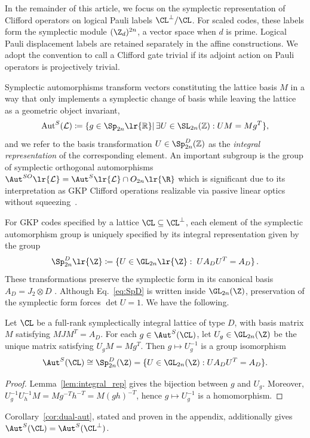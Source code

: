 \documentclass[a4paper, aps, pra, 11pt, onecolumn, tightenlines, superscriptaddress]{revtex4-2}
\begin{document}
In the remainder of this article, we focus on the symplectic representation of Clifford operators on logical Pauli labels $\CL^{\perp}/\CL$. For scaled codes, these labels form the symplectic module $(\Z_d)^{2n}$, a vector space when $d$ is prime. Logical Pauli displacement labels are retained separately in the affine constructions. We adopt the convention to call a Clifford gate trivial if its adjoint action on Pauli operators is projectively trivial.

Symplectic automorphisms transform vectors constituting the lattice basis $M$ in a way that only implements a symplectic change of basis while leaving the lattice as a geometric object invariant, 
\begin{equation}
\label{eq:AutS}
    \text{Aut}^{S}(\mathcal{L}) \coloneqq \{ g \in \Sp_{2n}\lr{\mathbb{R}} |\,  \exists U \in \SL_{2n}( \mathbb{Z}):  UM  = M g^{T}\},
\end{equation}
and we refer to the basis transformation $U\in \Sp^D_{2n}( \mathbb{Z})$ as the \textit{integral representation} of the corresponding element.
An important subgroup is the group of symplectic orthogonal automorphisms $\Aut^{SO}\lr{\mathcal{L}}=\Aut^{S}\lr{\mathcal{L}}\cap O_{2n}\lr{\R}$ which is significant due to its interpretation as GKP Clifford operations realizable via passive linear optics without squeezing~\cite{Weedbrook_2012}.

For GKP codes specified by a lattice $\CL \subseteq\CL^{\perp}$, each element of the symplectic automorphism group is uniquely specified by its integral representation given by the group
\begin{equation}
\label{eq:SpD}
    \Sp_{2n}^D\lr{\Z} \coloneqq \{U\in \GL_{2n}\lr{\Z}:\; UA_DU^T=A_D\}\,.
\end{equation}
These transformations preserve the symplectic form in its canonical basis $A_D=J_2\otimes D$ \cite{Birkenhake_2004}. 
Although Eq.~\eqref{eq:SpD} is written inside $\GL_{2n}(\Z)$, preservation of the symplectic form forces $\det U=1$.
We have the following.
\begin{lem}\label{prop:cliff}
Let $\CL$ be a full-rank symplectically integral lattice of type $D$, with basis matrix $M$ satisfying $MJM^T=A_D$. For each $g\in\Aut^S(\CL)$, let $U_g\in\GL_{2n}(\Z)$ be the unique matrix satisfying $U_gM=Mg^T$. Then $g\longmapsto U_g^{-1}$
is a group isomorphism
\begin{equation}
\Aut^S(\CL)\cong\Sp_{2n}^D(\Z)
=\{U\in\GL_{2n}(\Z):UA_DU^T=A_D\}.
\end{equation}
\end{lem}
\begin{proof}
Lemma~\ref{lem:integral_rep} gives the bijection between $g$ and $U_g$. Moreover, $U_g^{-1}U_h^{-1}M=Mg^{-T}h^{-T}=M(gh)^{-T}$, hence $g\mapsto U_g^{-1}$ is a homomorphism.
\end{proof}
Corollary~\ref{cor:dual-aut}, stated and proven in the appendix, additionally gives $\Aut^S(\CL)=\Aut^S(\CL^\perp)$.
\end{document}

